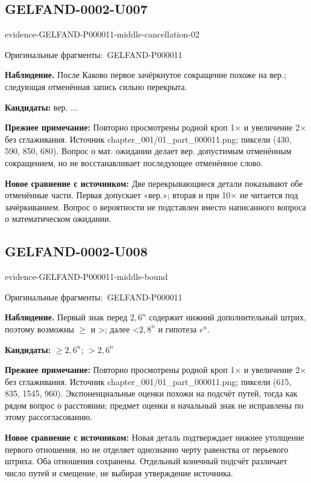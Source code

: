\documentclass[11pt]{article}
\newcommand{\EvidenceBlock}[4]{%
 \par\smallskip\noindent\begin{minipage}{\linewidth}
 \begin{minipage}[t]{.47\linewidth}\vspace{0pt}\centering
 \csname evidence-#1-#2\endcsname\par
 {\scriptsize\SourceCropCaption\ #1}\par
 \end{minipage}\hfill
 \begin{minipage}[t]{.49\linewidth}\vspace{0pt}\raggedright
 {\small\color{orange!65!black}\textbf{#4} #3}\par
 \end{minipage}
 \end{minipage}\par\smallskip}
\newcommand{\SourceCropCaption}{Оригинальные фрагменты:}\newcommand{\ReadingCaption}{Сомнительное чтение.}\newcommand{\IncompleteCaption}{Неразобранный фрагмент.}\newcommand{\DiagramCaption}{Рисунок и набранное описание.}
\begin{document}
\subsection*{GELFAND-0002-U007}
\EvidenceBlock{GELFAND-P000011}{middle-cancellation-02}{После Каково первое зачёркнутое сокращение похоже на вер.; следующая отменённая запись сильно перекрыта.}{Наблюдение.}
\par\smallskip\noindent\textbf{Кандидаты: } вер. ...\par
\par\smallskip\noindent\textbf{Прежнее примечание: } Повторно просмотрены родной кроп 1× и увеличение 2× без сглаживания. Источник chapter\_001/01\_part\_000011.png; пиксели (430, 590, 850, 680). Вопрос о мат. ожидании делает вер. допустимым отменённым сокращением, но не восстанавливает последующее отменённое слово.\par
\par\smallskip\noindent\textbf{Новое сравнение с источником: } Две перекрывающиеся детали показывают обе отменённые части. Первая допускает «вер.»; вторая и при 10× не читается под зачёркиванием. Вопрос о вероятности не подставлен вместо написанного вопроса о математическом ожидании.\par

\subsection*{GELFAND-0002-U008}
\EvidenceBlock{GELFAND-P000011}{middle-bound}{Первый знак перед \(2{,}6^n\) содержит нижний дополнительный штрих, поэтому возможны \(\ge\) и >; далее <\(2{,}8^n\) и гипотеза \(e^n\).}{Наблюдение.}
\par\smallskip\noindent\textbf{Кандидаты: } \(\geq2{,}6^n\); \(>2{,}6^n\)\par
\par\smallskip\noindent\textbf{Прежнее примечание: } Повторно просмотрены родной кроп 1× и увеличение 2× без сглаживания. Источник chapter\_001/01\_part\_000011.png; пиксели (615, 835, 1545, 960). Экспоненциальные оценки похожи на подсчёт путей, тогда как рядом вопрос о расстоянии; предмет оценки и начальный знак не исправлены по этому рассогласованию.\par
\par\smallskip\noindent\textbf{Новое сравнение с источником: } Новая деталь подтверждает нижнее утолщение первого отношения, но не отделяет однозначно черту равенства от перьевого штриха. Оба отношения сохранены. Отдельный конечный подсчёт различает число путей и смещение, не выбирая утверждение источника.\par
\end{document}
